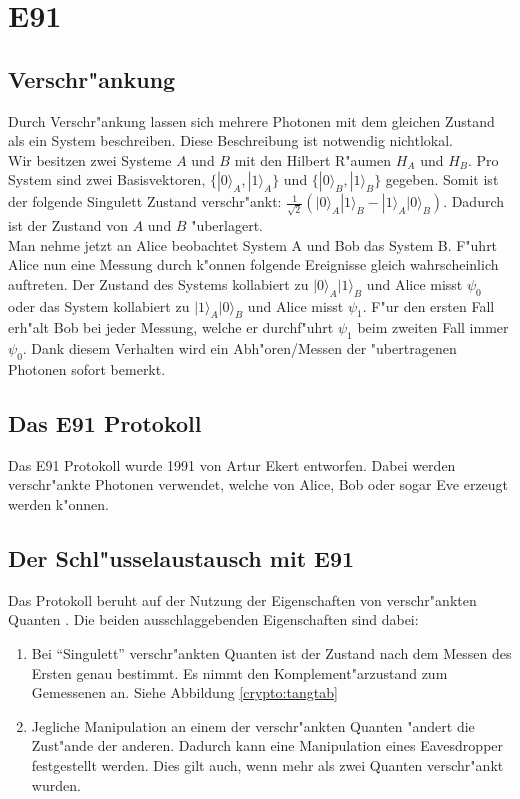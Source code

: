 \newcommand{\qcste}{$-22.5^{\circ}$}
\newcommand{\qcstz}{$0^{\circ}$}
\newcommand{\qcstd}{$22.5^{\circ}$}
\newcommand{\qcstv}{$45^{\circ}$}

\section{E91}
  \subsection{Verschr"ankung}
  Durch Verschr"ankung lassen sich mehrere Photonen mit dem gleichen Zustand als ein System beschreiben. Diese Beschreibung ist notwendig nichtlokal.\\
  	Wir besitzen zwei Systeme $A$ und $B$ mit den Hilbert R"aumen $H_A$ und $H_B$. Pro System sind zwei Basisvektoren,  $ \{|0\rangle_A,|1\rangle_A\}$ und $\{|0\rangle_B,|1\rangle_B\}$ gegeben. Somit ist der folgende Singulett Zustand verschr"ankt: $\frac{1}{\sqrt{2}}(\lvert0\rangle_A|1\rangle_B - |1\rangle_A|0\rangle_B) $. Dadurch ist der Zustand von $A$ und $B$ "uberlagert.\\
	Man nehme jetzt an Alice beobachtet System A und Bob das System B. F"uhrt Alice nun eine Messung durch k"onnen folgende Ereignisse gleich wahrscheinlich auftreten. Der Zustand des Systems kollabiert zu $\lvert0\rangle_A|1\rangle_B$ und Alice misst $\psi_0$ oder das System kollabiert zu $\lvert1\rangle_A|0\rangle_B$ und Alice misst $\psi_1$. F"ur den ersten Fall erh"alt Bob bei jeder Messung, welche er durchf"uhrt $\psi_1$ beim zweiten Fall immer $\psi_0$. Dank diesem Verhalten wird ein Abh"oren/Messen der "ubertragenen Photonen sofort bemerkt.

  \subsection{Das E91 Protokoll}
  Das E91 Protokoll wurde 1991 von Artur Ekert entworfen.
  Dabei werden verschr"ankte Photonen verwendet, welche von Alice, Bob oder sogar Eve erzeugt werden k"onnen.

  \subsection{Der Schl"usselaustausch mit E91}
  Das Protokoll beruht auf der Nutzung der Eigenschaften von verschr"ankten Quanten \cite{qc:verschraenkung}.
  Die beiden ausschlaggebenden Eigenschaften sind dabei:

  \begin{enumerate}
      \item Bei ``Singulett'' verschr"ankten Quanten ist der Zustand nach dem Messen des Ersten genau bestimmt.
        Es nimmt den Komplement"arzustand zum Gemessenen an.
        Siehe Abbildung \ref{crypto:tangtab}
      \item Jegliche Manipulation an einem der verschr"ankten Quanten "andert die Zust"ande der anderen.
        Dadurch kann eine Manipulation eines Eavesdropper festgestellt werden.
        Dies gilt auch, wenn mehr als zwei Quanten verschr"ankt wurden.
  \end{enumerate}

